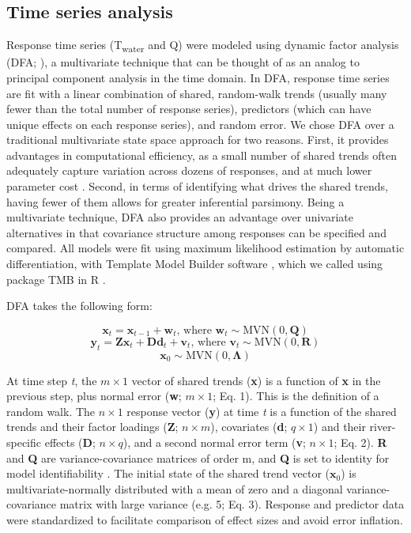 \documentclass[notitlepage]{article}
\begin{document}
\subsection*{Time series analysis}
Response time series (T\textsubscript{water} and Q) were modeled using dynamic factor analysis (DFA; \citealt{zuur2003estimating}), a multivariate technique that can be thought of as an analog to principal component analysis in the time domain. In DFA, response time series are fit with a linear combination of shared, random-walk trends (usually many fewer than the total number of response series), predictors (which can have unique effects on each response series), and random error. We chose DFA over a traditional multivariate state space approach for two reasons. First, it provides advantages in computational efficiency, as a small number of shared trends often adequately capture variation across dozens of responses, and at much lower parameter cost \citep{zuur2003dynamic}. Second, in terms of identifying what drives the shared trends, having fewer of them allows for greater inferential parsimony. Being a multivariate technique, DFA also provides an advantage over univariate alternatives in that covariance structure among responses can be specified and compared. All models were fit using maximum likelihood estimation by automatic differentiation, with Template Model Builder software \citep{kristensen2015tmb}, which we called using package TMB in R \citep{Rmanual,tmbPackage}.

DFA takes the following form:

\begin{equation}
    \textbf{x}_t = \textbf{x}_{t-1} + \textbf{w}_t\textrm{, where } \textbf{w}_t \sim \textrm{MVN}(0,\textbf{Q})
\end{equation}
\begin{equation}
    \textbf{y}_t = \textbf{Zx}_t + \textbf{Dd}_t + \textbf{v}_t\textrm{, where } \textbf{v}_t \sim \textrm{MVN}(0,\textbf{R})
\end{equation}
\begin{equation}
    \textbf{x}_0 \sim \textrm{MVN}(0,\bm{\Lambda})
\end{equation}

At time step {\it t}, the $m \times 1$ vector of shared trends (\textbf{x}) is a function of \textbf{x} in the previous step, plus normal error (\textbf{w}; $m\times 1$; Eq. 1). This is the definition of a random walk. The $n\times 1$ response vector (\textbf{y}) at time {\it t} is a function of the shared trends and their factor loadings (\textbf{Z}; $n\times m$), covariates (\textbf{d}; $q\times 1$) and their river-specific effects (\textbf{D}; $n\times q$), and a second normal error term (\textbf{v}; $n\times 1$; Eq. 2). \textbf{R} and \textbf{Q} are variance-covariance matrices of order m, and \textbf{Q} is set to identity for model identifiability \citep{harvey1990forecasting}. The initial state of the shared trend vector ($\bm{x}_0$) is multivariate-normally distributed with a mean of zero and a diagonal variance-covariance matrix with large variance (e.g. 5; Eq. 3). Response and predictor data were standardized to facilitate comparison of effect sizes and avoid error inflation.
\end{document}
